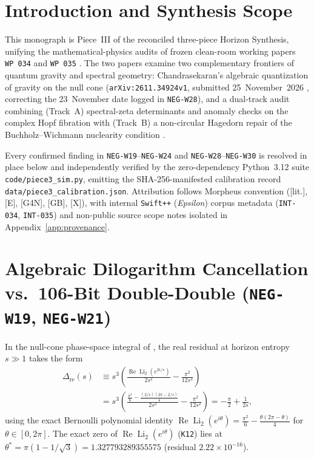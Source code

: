 \documentclass[11pt]{amsart}
\numberwithin{equation}{section}
\theoremstyle{plain}
\theoremstyle{definition}\newtheorem{definition}[theorem]{Definition}
\theoremstyle{remark}\newtheorem{remark}[theorem]{Remark}
\newcommand{\ctag}[1]{\textup{\textsf{\scriptsize[#1]}}}
\begin{document}
\section{Introduction and Synthesis Scope}
This monograph is Piece~III of the reconciled three-piece Horizon Synthesis, unifying the mathematical-physics audits of frozen clean-room working papers \texttt{WP~034} and \texttt{WP~035} \cite{ergentics2026wp034}. The two papers examine two complementary frontiers of quantum gravity and spectral geometry: Chandrasekaran's algebraic quantization of gravity on the null cone (\texttt{arXiv:2611.34924v1}, submitted 25~November~2026 \cite{chandrasekaran2026}, correcting the 23~November date logged in \texttt{NEG-W28}), and a dual-track audit combining (Track~A) spectral-zeta determinants and anomaly checks on the complex Hopf fibration \cite{nash1995,wyler1969,robertson1971,nielsen2026} with (Track~B) a non-circular Hagedorn repair \cite{hagedorn1965,atick1988} of the Buchholz--Wichmann nuclearity condition \cite{buchholz1986,ckn1999}.

Every confirmed finding in \texttt{NEG-W19}--\texttt{NEG-W24} and \texttt{NEG-W28}--\texttt{NEG-W30} is resolved in place below and independently verified by the zero-dependency Python~3.12 suite \texttt{code/piece3\_sim.py}, emitting the SHA-256-manifested calibration record \texttt{data/piece3\_calibration.json}. Attribution follows Morpheus convention (\ctag{lit.}, \ctag{E}, \ctag{G4N}, \ctag{GB}, \ctag{X}), with internal \texttt{Swift++} (\emph{Epsilon}) corpus metadata (\texttt{INT-034}, \texttt{INT-035}) and non-public source scope notes isolated in Appendix~\ref{app:provenance}.

\section{Algebraic Dilogarithm Cancellation vs.\ 106-Bit Double-Double (\texttt{NEG-W19}, \texttt{NEG-W21})}
In the null-cone phase-space integral of \cite{chandrasekaran2026}, the real residual at horizon entropy $s \gg 1$ takes the form
\begin{equation}\label{eq:dilog_exact}
\begin{split}
\Delta_{\mathrm{re}}(s)
&\equiv s^3 \left( \frac{\operatorname{Re}\operatorname{Li}_2(e^{2i/s})}{2 s^2} - \frac{\pi^2}{12 s^2} \right) \\
&= s^3 \left( \frac{\frac{\pi^2}{6} - \frac{(2/s)(2\pi - 2/s)}{4}}{2 s^2} - \frac{\pi^2}{12 s^2} \right)
= -\frac{\pi}{2} + \frac{1}{2s},
\end{split}
\end{equation}
using the exact Bernoulli polynomial identity $\operatorname{Re}\operatorname{Li}_2(e^{i\theta}) = \frac{\pi^2}{6} - \frac{\theta(2\pi - \theta)}{4}$ for $\theta \in [0, 2\pi]$. The exact zero of $\operatorname{Re}\operatorname{Li}_2(e^{i\theta})$ (\texttt{K12}) lies at $\theta^* = \pi(1 - 1/\sqrt{3}) = 1.327793289355575$ (residual $2.22\times 10^{-16}$).
\end{document}
